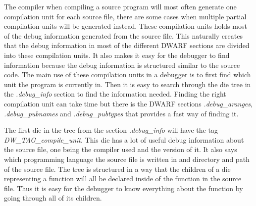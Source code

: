  


The compiler when compiling a source program will most often generate one compilation unit for each source file, there are some cases when multiple partial compilation units will be generated instead.
These compilation units holds most of the debug information generated from the source file.
This naturally creates that the debug information in most of the different \gls{DWARF} sections are divided into these compilation units.
It also makes it easy for the debugger to find information because the debug information is structured similar to the source code.
The main use of these compilation units in a debugger is to first find which unit the program is currently in.
Then it is easy to search through the \gls{die} \gls{tree} in the \emph{.debug\_info} section to find the information needed. 
Finding the right compilation unit can take time but there is the \gls{DWARF} sections \emph{.debug\_aranges}, \emph{.debug\_pubnames} and \emph{.debug\_pubtypes} that provides a fast way of finding it.


The first \gls{die} in the \gls{tree} from the section \emph{.debug\_info} will have the tag \emph{DW\_TAG\_compile\_unit}.
This \gls{die} has a lot of useful debug information about the source file, one being the compiler used and the version of it.
It also says which programming language the source file is written in and directory and path of the source file.
The \gls{tree} is structured in a way that the children of a \gls{die} representing a function will all be declared inside of the function in the source file.
Thus it is easy for the debugger to know everything about the function by going through all of its children.

